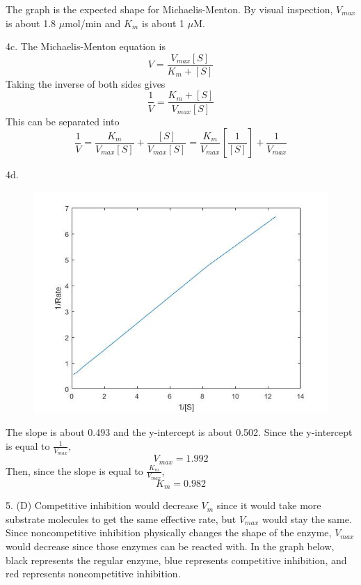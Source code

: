 \documentclass{article}
\begin{document}
The graph is the expected shape for Michaelis-Menton. By visual inspection, $V_{max}$ is about 1.8 $\mu$mol/min and $K_m$ is about 1 $\mu$M.

4c.	The Michaelis-Menton equation is 
$$V=\frac{V_{max}[S]}{K_m +[S]}$$ 
Taking the inverse of both sides gives 
$$\frac{1}{V}=\frac{K_m +[S]}{V_{max}[S]}$$ 
This can be separated into 
$$\frac{1}{V}=\frac{K_m}{V_{max}[S]}+\frac{[S]}{V_{max}[S]}
=\frac{K_m}{V_{max}}\left[\frac{1}{[S]}\right]+\frac{1}{V_{max}}$$

4d. \begin{figure}[h]
  \centering
  \includegraphics[scale=0.4]{lineweaver-burk.jpg}
\end{figure}

The slope is about 0.493 and the y-intercept is about 0.502. Since the y-intercept is equal to $\frac{1}{V_{max}}$, $$V_{max}=1.992$$ Then, since the slope is equal to 
$\frac{K_m}{V_{max}}$,
$$K_m=0.982$$

5. (D) Competitive inhibition would decrease $V_m$ since it would take more substrate molecules to get the same effective rate, but $V_{max}$ would stay the same. Since noncompetitive inhibition physically changes the shape of the enzyme, $V_{max}$ would decrease since those enzymes can be reacted with. In the graph below, black represents the regular enzyme, blue represents competitive inhibition, and red represents noncompetitive inhibition.
\end{document}
